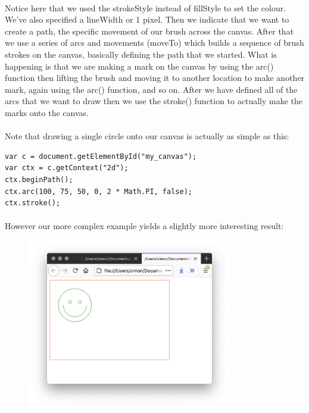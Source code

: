 \paragraph{} Notice here that we used the strokeStyle instead of fillStyle to set the colour. We've also specified a lineWidth or 1 pixel. Then we indicate that we want to create a path, the specific movement of our brush across the canvas. After that we use a series of arcs and movements (moveTo) which builds a sequence of brush strokes on the canvas, basically defining the path that we started. What is happening is that we are making a mark on the canvas by using the arc() function then lifting the brush and moving it to another location to make another mark, again using the arc() function, and so on. After we have defined all of the arcs that we want to draw then we use the stroke() function to actually make the marks onto the canvas.
\paragraph{} Note that drawing a single circle onto our canvas is actually as simple as this:

\begin{lstlisting}
var c = document.getElementById("my_canvas");
var ctx = c.getContext("2d");
ctx.beginPath();
ctx.arc(100, 75, 50, 0, 2 * Math.PI, false);
ctx.stroke();
\end{lstlisting}

\paragraph{} However our more complex example yields a slightly more interesting result:

\begin{figure}[H]
\centering
\includegraphics[width=0.8\textwidth]{figures/canvas-smiley}
\label{fig:canvas-smiley}
\caption{}
\end{figure}


